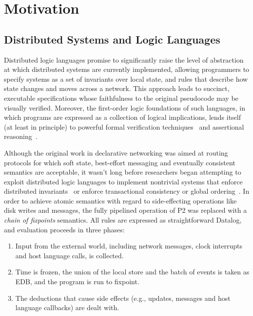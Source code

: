 \section{Motivation}

\subsection{Distributed Systems and Logic Languages}
\label{sec:dsll}


Distributed logic languages promise to significantly raise the level of abstraction
at which distributed systems are currently implemented, allowing programmers to
specify systems as a set of invariants over local state, and rules that describe how state changes and moves across a network.  This approach leads to succinct, executable specifications 
whose faithfulness to the original pseudocode may be visually verified.  Moreover, the 
first-order logic foundations of such languages, in which programs
are expressed as a collection of logical implications, lends itself (at least in principle) to 
powerful formal verification techniques~\cite{wang, wang2} and assertional
reasoning~\cite{boom-techr}.  

Although the original work in declarative networking was aimed at routing protocols for which soft state, best-effort messaging and eventually consistent semantics are acceptable, it wasn't
long before researchers began attempting to exploit distributed logic languages to implement
nontrivial systems that enforce distributed invariants~\cite{p2} or enforce transactional consistency or global ordering~\cite{netdb}.  In order to achieve atomic semantics with regard
to side-effecting operations like disk writes and messages, the fully pipelined operation of P2
was replaced with a \emph{chain of fixpoints} semantics.  All rules are expressed as 
straightforward Datalog, and evaluation proceeds in three phases:

\begin{enumerate}
\item Input from the external world, including network messages, clock interrupts and host language calls, is collected.
\item Time is frozen, the union of the local store and the batch of events is taken as EDB, and the program is run to fixpoint.
\item The deductions that cause side effects (e.g., updates, messages and host language callbacks) are dealt with.  
\end{enumerate}

